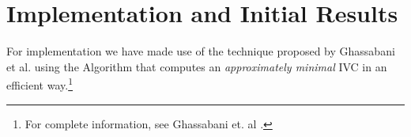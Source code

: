 \section{Implementation and Initial Results}
\label{sec:impl}

For implementation we have made use of the technique proposed by Ghassabani et al. \cite{Ghass16} using the Algorithm \ucalg that computes an \emph{approximately minimal} IVC in an efficient way.\footnote{For complete information, see Ghassabani et. al \cite{Ghass16}.}
%
%
